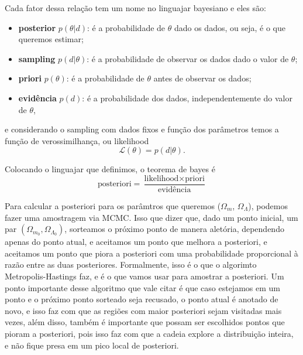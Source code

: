 \documentclass[11pt,a4paper]{article}
\newcommand{\Om}{\Omega_m}
\newcommand{\OL}{\Omega_\Lambda}
\begin{document}
Cada fator dessa relação tem um nome no linguajar bayesiano e eles são:
\begin{itemize}
  \item \textbf{posterior} $p(\theta|d)$: é a probabilidade de $\theta$ dado os dados, ou seja, é o que queremos estimar;
  \item \textbf{sampling} $p(d|\theta)$: é a probabilidade de observar os dados dado o valor de $\theta$;
  \item \textbf{priori} $p(\theta)$: é a probabilidade de $\theta$ antes de observar os dados;
  \item \textbf{evidência} $p(d)$: é a probabilidade dos dados, independentemente do valor de $\theta$,
\end{itemize}
e considerando o sampling com dados fixos e função dos parâmetros temos a função de verossimilhança, ou likelihood
\begin{equation}
  \mathcal{L}(\theta) = p(d|\theta).
\end{equation}

Colocando o linguajar que definimos, o teorema de bayes é 
\begin{equation}
    \text{posteriori}=\frac{\text{likelihood}\times\text{priori}}{\text{evidência}}
\end{equation}

Para calcular a posteriori para os parâmtros que queremos ($\Om$, $\OL$), podemos fazer uma amostragem via MCMC. 
Isso que dizer que, dado um ponto inicial, um par $(\Omega_{m_0}, \Omega_{\Lambda_0})$, sorteamos o próximo ponto de manera aletória, dependendo apenas do ponto atual,
e aceitamos um ponto que melhora a posteriori, e aceitamos um ponto que piora a posteriori com uma probabilidade proporcional 
à razão entre as duas posteriores. Formalmente, isso é o que o algorimto Metropolis-Hastings faz, e é o que vamos usar para amostrar a posteriori.
Um ponto importante desse algoritmo que vale citar é que caso estejamos em um ponto e o próximo ponto sorteado seja recusado, o 
ponto atual é anotado de novo, e isso faz com que as regiões com maior posteriori sejam visitadas mais vezes, além disso, também
é importante que possam ser escolhidos pontos que pioram a posteriori, pois isso faz com que a cadeia explore a distribuição inteira,
e não fique presa em um pico local de posteriori.
\end{document}
